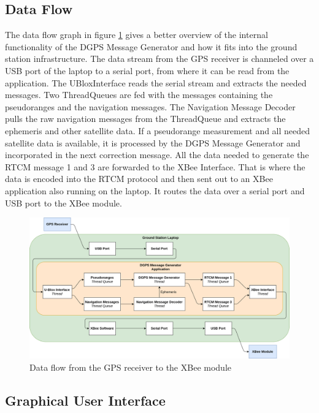 \subsection{Data Flow}

The data flow graph in figure \ref{fig:data_flow} gives a better overview of the internal functionality of the DGPS Message Generator and how it fits into the ground station infrastructure.
The data stream from the GPS receiver is channeled over a USB port of the laptop to a serial port, from where it can be read from the application.
The UBloxInterface reads the serial stream and extracts the needed messages.
Two ThreadQueues are fed with the messages containing the pseudoranges and the navigation messages.
The Navigation Message Decoder pulls the raw navigation messages from the ThreadQueue and extracts the ephemeris and other satellite data.
If a pseudorange measurement and all needed satellite data is available, it is processed by the DGPS Message Generator and incorporated in the next correction message.
All the data needed to generate the RTCM message 1 and 3 are forwarded to the XBee Interface.
That is where the data is encoded into the RTCM protocol and then sent out to an XBee application also running on the laptop.
It routes the data over a serial port and USB port to the XBee module.

\begin{figure}[ht]
 \centering
 \includegraphics[width=\textwidth]{images/Data_Flow.png}
 \caption{Data flow from the GPS receiver to the XBee module}
 \label{fig:data_flow}
\end{figure}

\subsection{Graphical User Interface}

